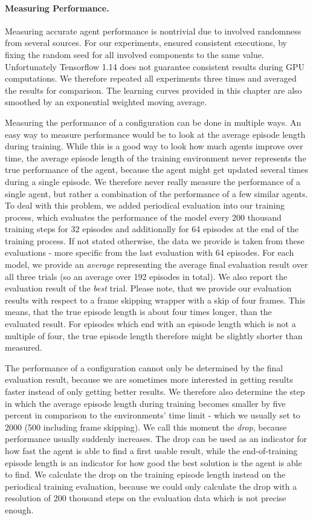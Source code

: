 \paragraph{Measuring Performance.}
Measuring accurate agent performance is nontrivial due to involved randomness from several sources. For our experiments, ensured consistent executions, by fixing the random seed for all involved components to the same value. Unfortunately Tensorflow 1.14 does not guarantee consistent results during GPU computations. We therefore repeated all experiments three times and averaged the results for comparison. The learning curves provided in this chapter are also smoothed by an exponential weighted moving average.

Measuring the performance of a configuration can be done in multiple ways. An easy way to measure performance would be to look at the average episode length during training. While this is a good way to look how much agents improve over time, the average episode length of the training environment never represents the true performance of the agent, because the agent might get updated several times during a single episode. We therefore never really measure the performance of a single agent, but rather a combination of the performance of a few similar agents. To deal with this problem, we added periodical evaluation into our training process, which evaluates the performance of the model every 200 thousand training steps for 32 episodes and additionally for 64 episodes at the end of the training process. If not stated otherwise, the data we provide is taken from these evaluations - more specific from the last evaluation with 64 episodes. For each model, we provide an \textit{average} representing the average final evaluation result over all three trials (so an average over 192 episodes in total). We also report the evaluation result of the \textit{best} trial. Please note, that we provide our evaluation results with respect to a frame skipping wrapper with a skip of four frames. This means, that the true episode length is about four times longer, than the evaluated result. For episodes which end with an episode length which is not a multiple of four, the true episode length therefore might be slightly shorter than measured.

The performance of a configuration cannot only be determined by the final evaluation result, because we are sometimes more interested in getting results faster instead of only getting better results. We therefore also determine the step in which the average episode length during training becomes smaller by five percent in comparison to the environments' time limit - which we usually set to 2000 (500 including frame skipping). We call this moment the \textit{drop}, because performance usually suddenly increases. The drop can be used as an indicator for how fast the agent is able to find a first usable result, while the end-of-training episode length is an indicator for how good the best solution is the agent is able to find. We calculate the drop on the training episode length instead on the periodical training evaluation, because we could only calculate the drop with a resolution of 200 thousand steps on the evaluation data which is not precise enough.

